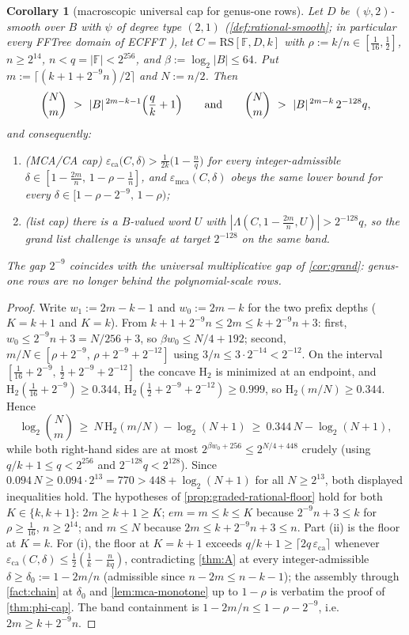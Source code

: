 \documentclass[11pt]{article}
\newtheorem{corollary}[theorem]{Corollary}
\theoremstyle{definition}
\theoremstyle{remark}
\newcommand{\F}{\mathbb{F}}
\newcommand{\B}{B}
\newcommand{\RS}{\mathrm{RS}}
\newcommand{\eca}{\varepsilon_{\mathrm{ca}}}
\newcommand{\emca}{\varepsilon_{\mathrm{mca}}}
\newcommand{\Lst}{\Lambda}
\newcommand{\Hb}{\mathrm{H}_2}
\begin{document}
\begin{corollary}[macroscopic universal cap for genus-one rows]\label{cor:ecfft-macroscopic}
Let $D$ be $(\psi,2)$-smooth over $\B$ with $\psi$ of degree type $(2,1)$ \textup(\cref{def:rational-smooth}; in particular every FFTree domain of ECFFT \cite{BCKL21}\textup), let $C=\RS[\F,D,k]$ with $\rho:=k/n\in[\tfrac1{16},\tfrac12]$, $n\ge2^{14}$, $n<q=|\F|<2^{256}$, and $\beta:=\log_2|\B|\le64$. Put $m:=\lceil(k+1+2^{-9}n)/2\rceil$ and $N:=n/2$. Then
\[
\binom Nm\ >\ |\B|^{\,2m-k-1}\Bigl(\frac qk+1\Bigr)
\qquad\text{and}\qquad
\binom Nm\ >\ |\B|^{\,2m-k}\,2^{-128}q ,
\]
and consequently:
\begin{enumerate}[label=\textup{(\roman*)}]
\item \textup(MCA/CA cap\textup) $\eca\bigl(C,\delta\bigr)>\frac1{2k}\bigl(1-\frac nq\bigr)$ for every integer-admissible $\delta\in[1-\frac{2m}n,\,1-\rho-\frac1n]$, and $\emca(C,\delta)$ obeys the same lower bound for every $\delta\in[1-\rho-2^{-9},\,1-\rho)$;
\item \textup(list cap\textup) there is a $\B$-valued word $U$ with $|\Lst(C,1-\frac{2m}n,U)|>2^{-128}q$, so the grand list challenge is unsafe at target $2^{-128}$ on the same band.
\end{enumerate}
The gap $2^{-9}$ coincides with the universal multiplicative gap of \cref{cor:grand}: genus-one rows are no longer behind the polynomial-scale rows.
\end{corollary}

\begin{proof}
Write $w_1:=2m-k-1$ and $w_0:=2m-k$ for the two prefix depths ($K=k+1$ and $K=k$). From $k+1+2^{-9}n\le2m\le k+2^{-9}n+3$: first, $w_0\le2^{-9}n+3=N/256+3$, so $\beta w_0\le N/4+192$; second, $m/N\in[\rho+2^{-9},\,\rho+2^{-9}+2^{-12}]$ using $3/n\le3\cdot2^{-14}<2^{-12}$. On the interval $[\tfrac1{16}+2^{-9},\,\tfrac12+2^{-9}+2^{-12}]$ the concave $\Hb$ is minimized at an endpoint, and $\Hb(\tfrac1{16}+2^{-9})\ge0.344$, $\Hb(\tfrac12+2^{-9}+2^{-12})\ge0.999$, so $\Hb(m/N)\ge0.344$. Hence
\[
\log_2\binom Nm\ \ge\ N\,\Hb(m/N)-\log_2(N+1)\ \ge\ 0.344\,N-\log_2(N+1),
\]
while both right-hand sides are at most $2^{\beta w_0+256}\le2^{N/4+448}$ crudely \textup(using $q/k+1\le q<2^{256}$ and $2^{-128}q<2^{128}$\textup). Since $0.094\,N\ge0.094\cdot2^{13}=770>448+\log_2(N+1)$ for all $N\ge2^{13}$, both displayed inequalities hold. The hypotheses of \cref{prop:graded-rational-floor} hold for both $K\in\{k,k+1\}$: $2m\ge k+1\ge K$; $em=m\le k\le K$ because $2^{-9}n+3\le k$ for $\rho\ge\tfrac1{16}$, $n\ge2^{14}$; and $m\le N$ because $2m\le k+2^{-9}n+3\le n$. Part \textup{(ii)} is the floor at $K=k$. For \textup{(i)}, the floor at $K=k+1$ exceeds $q/k+1\ge\lceil2q\,\eca\rceil$ whenever $\eca(C,\delta)\le\frac12(\frac1k-\frac n{kq})$, contradicting \cref{thm:A} at every integer-admissible $\delta\ge\delta_0:=1-2m/n$ \textup(admissible since $n-2m\le n-k-1$\textup); the assembly through \cref{fact:chain} at $\delta_0$ and \cref{lem:mca-monotone} up to $1-\rho$ is verbatim the proof of \cref{thm:phi-cap}. The band containment is $1-2m/n\le1-\rho-2^{-9}$, i.e.\ $2m\ge k+2^{-9}n$.
\end{proof}
\end{document}
